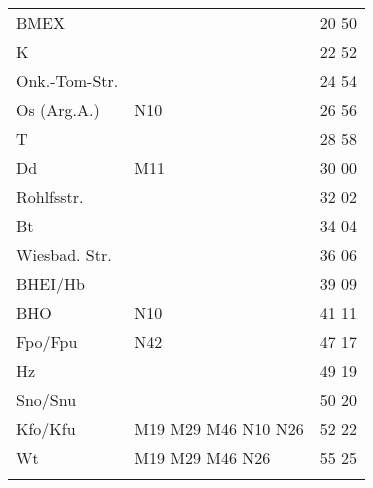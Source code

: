 \begin{tabular}{!{\color{schiefergrau}\vrule width 3pt}*{3}{l!{\color{schiefergrau}\vrule width 3pt}}}
\hline
{}
 \\
\hline
BMEX         &                                                                   & 20 50 \\
K            &                                                                   & 22 52 \\
Onk.-Tom-Str.&                                                                   & 24 54 \\
Os (Arg.A.)  & \nbus{} N10                                                       & 26 56 \\
T            &                                                                   & 28 58 \\
Dd           & \mbus{} M11                                                       & 30 00 \\
Rohlfsstr.   &                                                                   & 32 02 \\
Bt           &                                                                   & 34 04 \\
Wiesbad. Str.&                                                                   & 36 06 \\
BHEI/Hb      &                                                                   & 39 09 \\
BHO          & \nbus{} N10                                                       & 41 11 \\
Fpo/Fpu      & \nusieben{} \nbus{} N42                                           & 47 17 \\
Hz           &                                                                   & 49 19 \\
Sno/Snu      & \nuneun{}                                                         & 50 20 \\
Kfo/Kfu      & \nueins{} \nuzwei{} \nuneun{} \mbus{} M19 M29 M46 \nbus{} N10 N26 & 52 22 \\
Wt           & \nueins{} \nuzwei{} \mbus{} M19 M29 M46 \nbus{} N26               & 55 25 \\
\myhline
\end{tabular}
